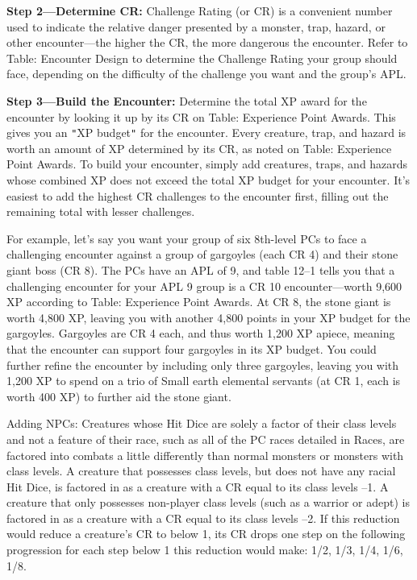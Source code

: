 				
\textbf{Step 2---Determine CR:} Challenge Rating (or CR) is a convenient number used to indicate the relative danger presented by a monster, trap, hazard, or other encounter---the higher the CR, the more dangerous the encounter. Refer to Table: Encounter Design to determine the Challenge Rating your group should face, depending on the difficulty of the challenge you want and the group's APL.
				
\textbf{Step 3---Build the Encounter:} Determine the total XP award for the encounter by looking it up by its CR on Table: Experience Point Awards. This gives you an \texttt{{}"{}}XP budget\texttt{{}"{}} for the encounter. Every creature, trap, and hazard is worth an amount of XP determined by its CR, as noted on Table: Experience Point Awards. To build your encounter, simply add creatures, traps, and hazards whose combined XP does not exceed the total XP budget for your encounter. It's easiest to add the highest CR challenges to the encounter first, filling out the remaining total with lesser challenges.
				
For example, let's say you want your group of six 8th-level PCs to face a challenging encounter against a group of gargoyles (each CR 4) and their stone giant boss (CR 8). The PCs have an APL of 9, and table 12--1 tells you that a challenging encounter for your APL 9 group is a CR 10 encounter---worth 9,600 XP according to Table: Experience Point Awards. At CR 8, the stone giant is worth 4,800 XP, leaving you with another 4,800 points in your XP budget for the gargoyles. Gargoyles are CR 4 each, and thus worth 1,200 XP apiece, meaning that the encounter can support four gargoyles in its XP budget. You could further refine the encounter by including only three gargoyles, leaving you with 1,200 XP to spend on a trio of Small earth elemental servants (at CR 1, each is worth 400 XP) to further aid the stone giant.
				
Adding NPCs: Creatures whose Hit Dice are solely a factor of their class levels and not a feature of their race, such as all of the PC races detailed in Races, are factored into combats a little differently than normal monsters or monsters with class levels. A creature that possesses class levels, but does not have any racial Hit Dice, is factored in as a creature with a CR equal to its class levels --1. A creature that only possesses non-player class levels (such as a warrior or adept) is factored in as a creature with a CR equal to its class levels --2. If this reduction would reduce a creature's CR to below 1, its CR drops one step on the following progression for each step below 1 this reduction would make: 1/2, 1/3, 1/4, 1/6, 1/8.
				
